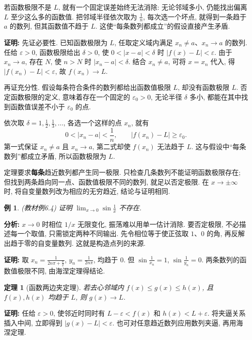 \documentclass[UTF8,openany]{ctexbook}
\theoremstyle{chinesetextbook}
\newtheorem{example}{例}[section]
\newtheorem{theorem}{定理}[section]
\newenvironment{cnproof}{\par\indent\textbf{证明:} \ignorespaces}{\par}
\begin{document}
若函数极限不是 $L$, 就有一个固定误差始终无法消除: 无论邻域多小, 仍能找出偏离 $L$ 至少这么多的函数值. 把邻域半径依次取为 $\displaystyle\frac1n$, 每次选一个坏点, 就得到一条趋于 $a$ 的数列, 但其函数值不趋于 $L$. 这使“每条数列都成立”的假设直接产生矛盾.
\begin{cnproof}
先证必要性. 已知函数极限为 $L$, 任取定义域内满足 $x_n\ne a$、$x_n\to a$ 的数列. 任给 $\varepsilon>0$, 函数极限给出 $\delta>0$, 使 $0<|x-a|<\delta$ 时 $|f(x)-L|<\varepsilon$. 由于 $x_n\to a$, 存在 $N$, 使 $n>N$ 时 $|x_n-a|<\delta$. 结合 $x_n\ne a$, 可将 $x=x_n$ 代入, 得 $|f(x_n)-L|<\varepsilon$, 故 $f(x_n)\to L$.

再证充分性. 假设每条符合条件的数列都给出函数值极限 $L$, 却没有函数极限 $L$. 否定函数极限的定义, 意味着存在一个固定的 $\varepsilon_0>0$, 无论半径 $\delta$ 多小, 都能在其中找到函数值误差不小于 $\varepsilon_0$ 的点.

依次取 $\displaystyle\delta=1,\frac12,\frac13,\ldots$, 各选一个这样的点 $x_n$, 就有
\[
0<|x_n-a|<\frac1n,\qquad |f(x_n)-L|\ge\varepsilon_0.
\]
第一式保证 $x_n\ne a$ 且 $x_n\to a$, 第二式却使 $f(x_n)$ 无法趋于 $L$. 这与假设中“每条数列”都成立矛盾, 所以函数极限为 $L$.
\end{cnproof}
定理要求\textbf{每条}趋近数列都产生同一极限. 只检查几条数列不能证明函数极限存在; 但找到两条趋向同一点、函数值极限不同的数列, 就足以否定极限. 在 $x\to\pm\infty$ 时, 将自变量数列改为相应的无穷趋近, 结论与证明相同.
\begin{example}
(教材例6.4) 证明 $\displaystyle \lim_{x\to0}\sin\frac1x$ 不存在.
\end{example}
\par\indent\textbf{分析:} $x\to0$ 时相位 $1/x$ 无限变化, 振荡难以用单一估计消除. 要否定极限, 不必描述每一个取值, 只需锁定两种不同输出. 先令相位等于使正弦取 $1$、$0$ 的角, 再反解出趋于零的自变量数列. 这就是构造点列的来源.
\begin{cnproof}
取 $\displaystyle x_n=\frac1{2n\pi+\frac\pi2}$, $\displaystyle y_n=\frac1{2n\pi}$, 均趋于 $0$. 但 $\displaystyle \sin\frac1{x_n}=1$, $\displaystyle \sin\frac1{y_n}=0$. 两条数列的函数值极限不同, 由海涅定理得结论.
\end{cnproof}
\begin{theorem}[函数两边夹定理]
若去心邻域内 $f(x)\le g(x)\le h(x)$, 且 $f(x),h(x)$ 均趋于 $L$, 则 $g(x)\to L$.
\end{theorem}
\begin{cnproof}
任给 $\varepsilon>0$, 使邻近时同时有 $L-\varepsilon<f(x)$ 和 $h(x)<L+\varepsilon$. 将夹逼关系插入中间, 立即得到 $|g(x)-L|<\varepsilon$. 也可对任意趋近数列应用数列夹逼, 再用海涅定理.
\end{cnproof}
\end{document}
